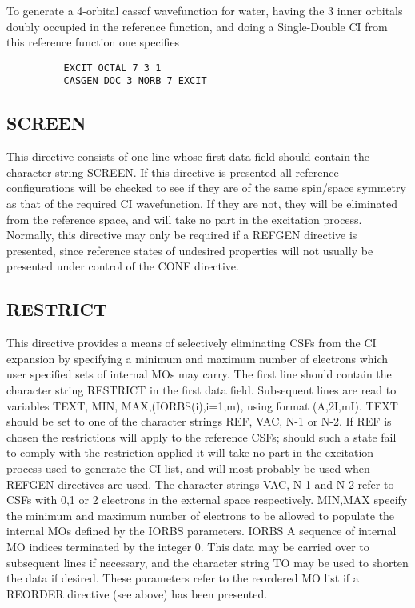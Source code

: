 \documentclass[11pt,fleqn]{article}
\begin{document}
To generate a 4-orbital casscf wavefunction for water, having the
3 inner orbitals doubly occupied in the reference function,
and doing a Single-Double CI from this reference function one specifies
{
\footnotesize
\begin{verbatim}
          EXCIT OCTAL 7 3 1
          CASGEN DOC 3 NORB 7 EXCIT
\end{verbatim}
}

\subsection[SCREEN]{SCREEN}

This directive consists of one line whose first data field should
contain the character string SCREEN. If this directive is presented
all reference configurations will be checked to see if they are
of the same spin/space symmetry as that of the required CI wavefunction.
If they are not, they will be eliminated from the reference space,
and will take no part in the excitation process. Normally, this directive
may only be required if a REFGEN directive is presented, since
reference states of undesired properties will not usually be presented
under control of the CONF directive.


\subsection[RESTRICT]{ RESTRICT}

 This directive provides a means of selectively eliminating CSFs from
the CI expansion by specifying a minimum and maximum number of
electrons which user specified sets of internal MOs may carry. The
first line should contain the character string RESTRICT in the first
data field.
Subsequent lines are read to variables TEXT, MIN, MAX,(IORBS(i),i=1,m),
using format (A,2I,mI).
 TEXT should be set to one of the character strings REF, VAC, N-1
or N-2. If REF is chosen the restrictions will apply to the reference
CSFs; should such a state fail to comply with the restriction applied
it will take no part in the excitation process used to generate the CI
list, and will most probably be used when REFGEN directives are used.
The character strings VAC, N-1 and N-2 refer to CSFs with 0,1 or 2
electrons in the external space respectively.
 MIN,MAX specify the minimum and maximum number of electrons to be
allowed to populate the internal MOs defined by the IORBS parameters.
 IORBS A sequence of internal MO indices terminated by the integer 0.
This data may be carried over to subsequent lines if necessary,
and the character string TO may be used to shorten the data if desired.
These parameters refer to the reordered MO list if a REORDER
directive (see above) has been presented.\\
\end{document}
